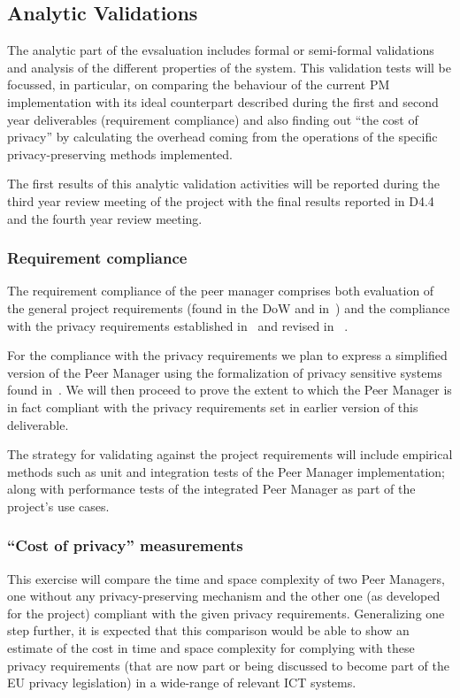 \subsection{Analytic Validations}
The analytic part of the evsaluation includes formal or semi-formal validations and analysis of the different properties of the system. This validation tests will be focussed, in particular, on comparing the behaviour of the current PM implementation with its ideal counterpart described during the first and second year deliverables (requirement compliance) and also finding out ``the cost of privacy'' by calculating the overhead %
coming from the operations of the specific privacy-preserving methods implemented.

The first results of this analytic validation activities will be reported during the third year review meeting of the project with the final results reported in D4.4 and the fourth year review meeting.

\subsubsection{Requirement compliance}
The requirement compliance of the peer manager comprises both evaluation of the general project requirements (found in the DoW and in~\cite{D1.1}) and the compliance with the privacy requirements established in~\cite{D4.1} and revised in ~\cite{D4.2}.

For the compliance with the privacy requirements we plan to express a simplified version of the Peer Manager using the formalization of privacy sensitive systems found in~\cite{ITSecPriv:2001lq}. We will then proceed to prove the extent to which the %
Peer Manager is in fact compliant with the privacy requirements set in earlier version of this deliverable. 

The strategy for validating against the project requirements will include empirical methods such as unit and integration tests of the Peer Manager implementation; along with performance tests of the integrated Peer Manager as part of the project's use cases. %

\subsubsection{``Cost of privacy'' measurements}
This exercise will compare the time and space complexity of two Peer Managers, one without any privacy-preserving mechanism and the other one (as developed for the project) compliant with the given privacy requirements. Generalizing one step further, it is expected that this comparison would be able to show an estimate of the cost in time and space complexity for complying with these privacy requirements (that are now part or being discussed to become part of the EU privacy legislation) in a wide-range of relevant ICT systems.

